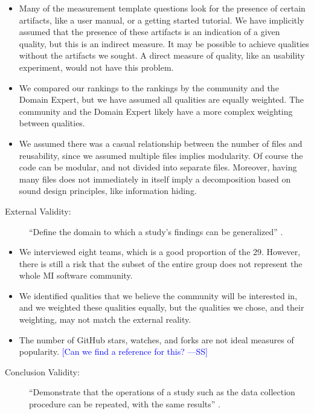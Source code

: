 \documentclass[final, 3p, times, authoryear]{elsarticle}
\newcommand{\authornote}[3]{\textcolor{#1}{[#3 ---#2]}}
\newcommand{\authornote}[3]{}
\newcommand{\wss}[1]{\authornote{blue}{SS}{#1}} %
\begin{document}
\begin{itemize}
    \item Many of the measurement template questions look for the presence of
    certain artifacts, like a user manual, or a getting started tutorial.  We
    have implicitly assumed that the presence of these artifacts is an
    indication of a given quality, but this is an indirect measure.  It may be
    possible to achieve qualities without the artifacts we sought.  A direct
    measure of quality, like an usability experiment, would not have this
    problem.
    \item We compared our rankings to the rankings by the community and the
    Domain Expert, but we have assumed all qualities are equally weighted.  The
    community and the Domain Expert likely have a more complex weighting between
    qualities.
    \item We assumed there was a casual relationship between the number of files
    and reusability, since we assumed multiple files implies modularity.  Of
    course the code can be modular, and not divided into separate files.
    Moreover, having many files does not immediately in itself imply a
    decomposition based on sound design principles, like information hiding.
\end{itemize}

\begin{description}
    \item[External Validity:] ``Define the domain to which a study's findings
    can be generalized'' \citep{ZhouEtAl2016}.
\end{description}

\begin{itemize}
\item We interviewed eight teams, which is a good proportion of the 29. However,
there is still a risk that the subset of the entire group does not represent the
whole MI software community.
\item We identified qualities that we believe the community will be interested
in, and we weighted these qualities equally, but the qualities we chose, and
their weighting, may not match the external reality.
\item The number of GitHub stars, watches, and forks are not ideal measures of
popularity.  \wss{Can we find a reference for this?}
\end{itemize}

\begin{description}
    \item[Conclusion Validity:] ``Demonstrate that the operations of a study
    such as the data collection procedure can be repeated, with the same
    results'' \citep{ZhouEtAl2016}.
\end{description}
\end{document}
